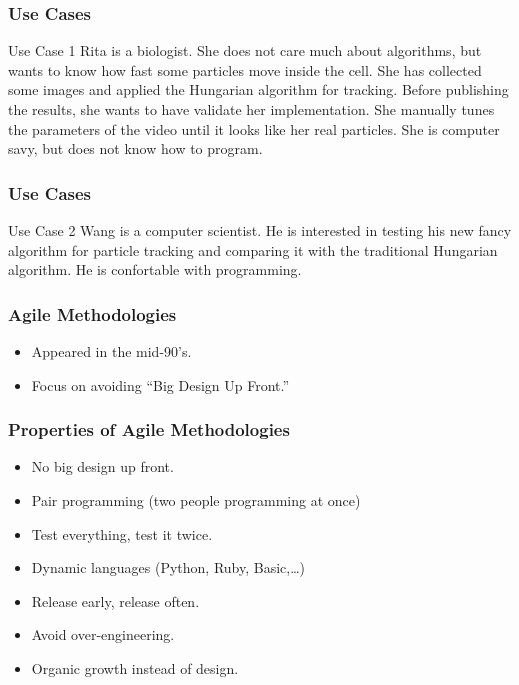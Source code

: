 \begin{frame}[fragile]
\frametitle{Use Cases}
\begin{block}{Use Case 1}
Rita is a biologist. She does not care much about algorithms, but wants to know how
fast some particles move inside the cell. She has collected some images and applied
the Hungarian algorithm for tracking. Before publishing the results, she wants to have
validate her implementation. She manually tunes the parameters of the video until it looks 
like her real particles. She is computer savy, but does not know how to program.
\end{block}
\end{frame}

\begin{frame}[fragile]
\frametitle{Use Cases}
\begin{block}{Use Case 2}
Wang is a computer scientist. He is interested in testing his new fancy algorithm for
particle tracking and comparing it with the traditional Hungarian algorithm. He is confortable
with programming.
\end{block}
\end{frame}


\begin{frame}[fragile]
\frametitle{Agile Methodologies}

\begin{itemize}
\item Appeared in the mid-90's.
\item Focus on avoiding ``Big Design Up Front.''
\end{itemize}
\end{frame}

\begin{frame}[fragile]
\frametitle{Properties of Agile Methodologies}
\begin{itemize}
\item No big design up front.
\item Pair programming (two people programming at once) 
\item Test everything, test it twice.
\item Dynamic languages (Python, Ruby, Basic,\ldots)
\item Release early, release often.
\item Avoid over-engineering.
\item Organic growth instead of design.
\end{itemize}
\end{frame}



